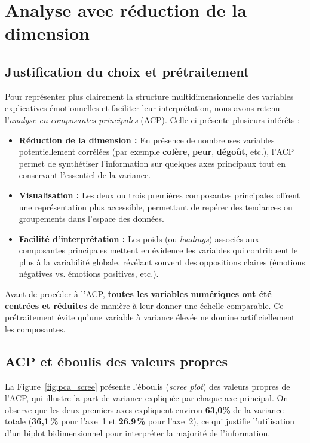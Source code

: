 \documentclass[12pt,a4paper]{article}
\begin{document}







\section{Analyse avec réduction de la dimension}
\subsection{Justification du choix et prétraitement}
Pour représenter plus clairement la structure multidimensionnelle des variables explicatives 
émotionnelles et faciliter leur interprétation, nous avons retenu 
l’\textit{analyse en composantes principales} (ACP). Celle-ci présente plusieurs intérêts :
\begin{itemize}
	\item \textbf{Réduction de la dimension :} En présence de nombreuses variables 
	potentiellement corrélées (par exemple \textbf{colère}, \textbf{peur}, 
	\textbf{dégoût}, etc.), l’ACP permet de synthétiser l’information sur quelques axes 
	principaux tout en conservant l’essentiel de la variance.
	\item \textbf{Visualisation :} Les deux ou trois premières composantes principales 
	offrent une représentation plus accessible, permettant de repérer des tendances 
	ou groupements dans l’espace des données.
	\item \textbf{Facilité d’interprétation :} Les poids (ou \textit{loadings}) associés 
	aux composantes principales mettent en évidence les variables qui contribuent 
	le plus à la variabilité globale, révélant souvent des oppositions claires 
	(émotions négatives vs. émotions positives, etc.).
\end{itemize}

Avant de procéder à l’ACP, \textbf{toutes les variables numériques ont été centrées et réduites} 
de manière à leur donner une échelle comparable. Ce prétraitement évite qu’une variable 
à variance élevée ne domine artificiellement les composantes.

\subsection{ACP et éboulis des valeurs propres}
La Figure~\ref{fig:pca_scree} présente l’éboulis (\textit{scree plot}) 
des valeurs propres de l’ACP, qui illustre la part de variance 
expliquée par chaque axe principal. On observe que les deux premiers axes 
expliquent environ \textbf{63,0\%} de la variance totale 
(\textbf{36,1\,\%} pour l’axe~1 et \textbf{26,9\,\%} pour l’axe~2), 
ce qui justifie l’utilisation d’un biplot bidimensionnel 
pour interpréter la majorité de l’information.
\end{document}
